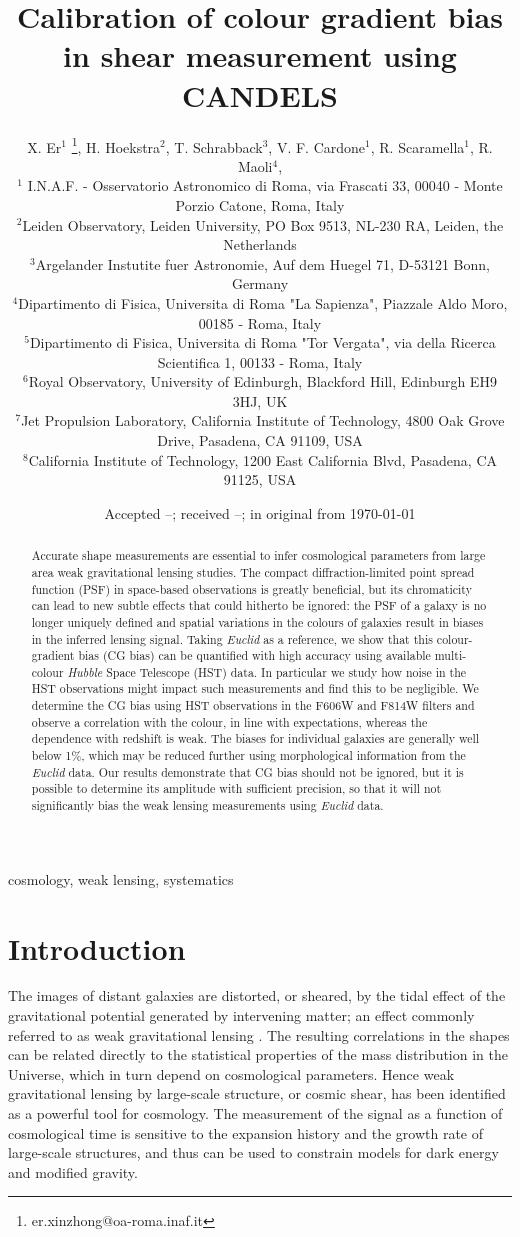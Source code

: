 \documentclass[useAMS,usenatbib]{mnras}
\title[Colour gradient bias]
{Calibration of colour gradient bias in shear measurement using CANDELS}
\author[X. Er et al.]%
{
X. Er$^1$ \thanks{er.xinzhong@oa-roma.inaf.it},
H. Hoekstra$^2$, T. Schrabback$^3$, V. F. Cardone$^1$, R. Scaramella$^1$, R. Maoli$^4$,
\newauthor{M. Vicinanza$^{1,4,5}$, B. Gillis$^{6}$ J. Rhodes$^{7,8}$}
\\
$^1$ I.N.A.F. - Osservatorio Astronomico di Roma, via Frascati 33, 00040 - Monte Porzio Catone, Roma, Italy\\
$^2$Leiden Observatory, Leiden University, PO Box 9513, NL-230 RA, Leiden, the Netherlands \\
$^3$Argelander Instutite fuer Astronomie, Auf dem Huegel 71, D-53121 Bonn, Germany\\
$^4$Dipartimento di Fisica, Universita di Roma "La Sapienza", Piazzale Aldo Moro, 00185 - Roma, Italy\\
$^5$Dipartimento di Fisica, Universita di Roma "Tor Vergata", via della Ricerca Scientifica 1, 00133 - Roma, Italy\\
$^6$Royal Observatory, University of Edinburgh, Blackford Hill, Edinburgh EH9 3HJ, UK\\
$^7$Jet Propulsion Laboratory, California Institute of Technology, 4800 Oak Grove Drive, Pasadena, CA 91109, USA\\
$^8$California Institute of Technology, 1200 East California Blvd, Pasadena, CA 91125, USA
}
\date{Accepted --;  received --;  in original from \today}
\begin{document}
\maketitle

\begin{abstract}
Accurate shape measurements are essential to infer cosmological parameters from large area weak gravitational lensing studies. The compact diffraction-limited point spread function (PSF) in space-based observations is greatly beneficial, but its chromaticity can lead to new subtle effects that could hitherto be ignored: the PSF of a galaxy is no longer uniquely defined  and spatial variations in the colours of galaxies result in biases in the inferred lensing signal. Taking {\it Euclid} as a reference, we show that this colour-gradient bias (CG bias) can be quantified with high accuracy using available multi-colour {\it Hubble} Space Telescope (HST) data. In particular we study how noise in the HST observations might impact such measurements and find this to be negligible. We determine the CG bias using HST observations in the F606W and F814W filters and observe a correlation with the colour, in line with expectations, whereas the dependence with redshift is weak. The biases for individual galaxies are generally well below 1\%, which may be reduced further using morphological information from the {\it Euclid} data. Our results demonstrate that CG bias should not be ignored, but it is possible to determine its amplitude with sufficient precision, so that it will not significantly bias the weak lensing measurements using {\it Euclid} data.
\end{abstract}
\begin{keywords} cosmology, weak lensing, systematics
\end{keywords}


\section{Introduction}

The images of distant galaxies are distorted, or sheared, by the tidal effect of the gravitational  potential generated by intervening matter; an effect commonly referred to as weak gravitational lensing \citep[see e.g.][for a detailed introduction]{Bartelmann01}. The resulting correlations in the shapes can be related directly to the statistical properties of the mass distribution in the Universe, which in turn depend on cosmological parameters. Hence weak gravitational lensing by large-scale structure, or cosmic shear, has been identified as a powerful tool for cosmology. The measurement of the signal as a function of cosmological time is sensitive to the expansion history and the growth rate of large-scale structures, and thus can be used to constrain models for dark energy and modified gravity.
\end{document}
